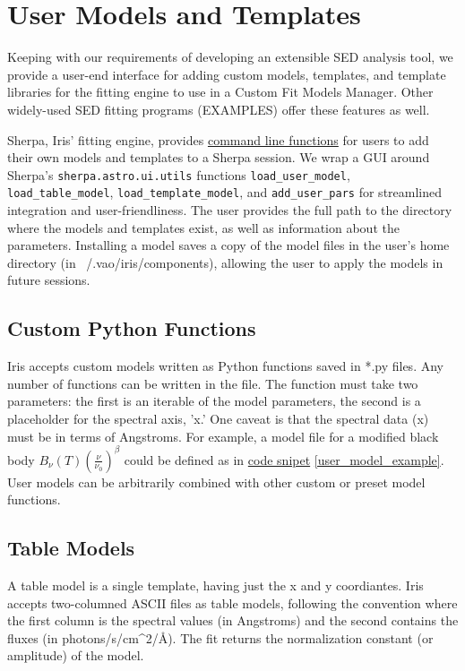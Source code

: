 \section{User Models and Templates}
\label{sec:usermodels}

Keeping with our requirements of developing an extensible SED analysis tool, we provide a user-end interface for adding custom models, templates, and template libraries for the fitting engine to use in a Custom Fit Models Manager. Other widely-used SED fitting programs (EXAMPLES) offer these features as well.

Sherpa, Iris' fitting engine, provides \underline{command line functions} for users to add their own models and templates to a Sherpa session. We wrap a GUI around Sherpa's \texttt{sherpa.astro.ui.utils} functions \texttt{load_user_model}, \texttt{load_table_model}, \texttt{load_template_model}, and \texttt{add_user_pars} for streamlined integration and user-friendliness. The user provides the full path to the directory where the models and templates exist, as well as information about the parameters. Installing a model saves a copy of the model files in the user's home directory (in ~/.vao/iris/components), allowing the user to apply the models in future sessions.


\subsection{Custom Python Functions}
Iris accepts custom models written as Python functions saved in *.py files. Any number of functions can be written in the file. The function must take two parameters: the first is an iterable of the model parameters, the second is a placeholder for the spectral axis, 'x.' One caveat is that the spectral data (x) must be in terms of Angstroms. For example, a model file for a modified black body
\(B_{\nu}(T) \left(\frac{\nu}{\nu_{0}}\right)^{\beta}\)
could be defined as in \underline{code snipet} \ref{user_model_example}. User models can be arbitrarily combined with other custom or preset model functions.

\subsection{Table Models}
A table model is a single template, having just the x and y coordiantes. Iris accepts two-columned ASCII files as table models, following the convention where the first column is the spectral values (in Angstroms) and the second contains the fluxes (in photons/s/cm^{2}/\AA). The fit returns the normalization constant (or amplitude) of the model.

